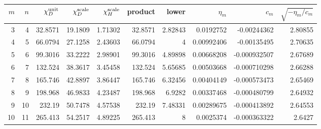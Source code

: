 \begin{tabular}{rrrrrrrrrr}
\toprule
$m$&$n$&$\chi_D^{\rm unit}$&$\chi_D^{\rm scale}$&$\chi_H^{\rm scale}$&product&lower&$\eta_m$&$c_m$&$\sqrt{-\eta_m/c_m}$\\
\midrule
3&4&32.8571&19.1809&1.71302&32.8571&2.82843&0.0192752&-0.00244362&2.80855\\
4&5&66.0794&27.1258&2.43603&66.0794&4&0.00992406&-0.00135495&2.70635\\
5&6&99.3016&33.2222&2.98901&99.3016&4.89898&0.00668208&-0.000932507&2.67689\\
6&7&132.524&38.3617&3.45458&132.524&5.65685&0.00503668&-0.000710298&2.66288\\
7&8&165.746&42.8897&3.86447&165.746&6.32456&0.00404149&-0.000573473&2.65469\\
8&9&198.968&46.9833&4.23487&198.968&6.9282&0.00337468&-0.000480799&2.64932\\
9&10&232.19&50.7478&4.57538&232.19&7.48331&0.00289675&-0.000413892&2.64553\\
10&11&265.413&54.2517&4.89225&265.413&8&0.0025374&-0.000363322&2.6427\\
\bottomrule
\end{tabular}
